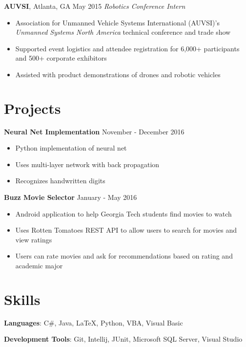 \documentclass[10pt]{article}
\begin{document}
\vspace{3pt}

\textbf{AUVSI}, Atlanta, GA \hfill May 2015
\linebreak
\textit{Robotics Conference Intern}
\begin{itemize}
    \item Association for Unmanned Vehicle Systems International (AUVSI)'s \emph{Unmanned Systems North America} technical conference and trade show
    \item Supported event logistics and attendee registration for 6,000+ participants and 500+ corporate exhibitors
    \item Assisted with product demonstrations of drones and robotic vehicles
\end{itemize}

\section*{Projects}
\textbf{Neural Net Implementation} \hfill November - December 2016
\begin{itemize}
    \item Python implementation of neural net
    \item Uses multi-layer network with back propagation
    \item Recognizes handwritten digits
\end{itemize}

\vspace{3pt}

\textbf{Buzz Movie Selector} \hfill January - May 2016
\begin{itemize}
    \item Android application to help Georgia Tech students find movies to watch
    \item Uses Rotten Tomatoes REST API to allow users to search for movies and view ratings
    \item Users can rate movies and ask for recommendations based on rating and academic major
\end{itemize}

\section*{Skills}
\textbf{Languages}: C\#, Java, \LaTeX, Python, VBA, Visual Basic

\vspace{3pt}

\textbf{Development Tools}: Git, Intellij, JUnit, Microsoft SQL Server, Visual Studio
\end{document}
